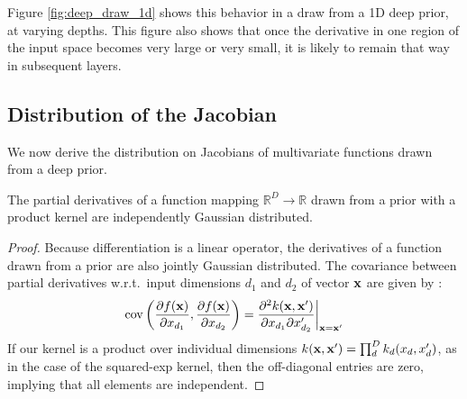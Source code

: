 Figure \ref{fig:deep_draw_1d} shows this behavior in a draw from a 1D deep \gp{} prior, at varying depths.  This figure also shows that once the derivative in one region of the input space becomes very large or very small, it is likely to remain that way in subsequent layers.
%







\subsection{Distribution of the Jacobian}
\label{sec:theorem}

We now derive the distribution on Jacobians of multivariate functions drawn from a deep \gp{} prior.

\begin{lemma}
\label{thm:deriv-ind}
The partial derivatives of a function mapping $\mathbb{R}^D \rightarrow \mathbb{R}$ drawn from a \gp{} prior with a product kernel are independently Gaussian distributed.
\end{lemma}
%
\begin{proof}
Because differentiation is a linear operator, the derivatives of a function drawn from a \gp{} prior are also jointly Gaussian distributed.  The covariance between partial derivatives w.r.t.\ input dimensions $d_1$ and $d_2$ of vector ${\bf{x}}$ are given by \citet{Solak03derivativeobservations}:
%
\begin{align}
\operatorname{cov} \left( \frac{\partial f({\bf{x}})}{\partial x_{d_1}}, \frac{\partial f({\bf{x}})}{\partial x_{d_2}} \right) 
= \frac{\partial^2 k({\bf{x}}, {\bf{x}}')}{\partial x_{d_1} \partial x_{d_2}'} \bigg|_{{\bf{x}}={\bf{x}}'}
\end{align}
%
If our kernel is a product over individual dimensions $k({\bf{x}}, {\bf{x}}') = \prod_d^D k_d(x_d, x_d')$, as in the case of the squared-exp kernel, then the off-diagonal entries are zero, implying that all elements are independent.
\end{proof}

